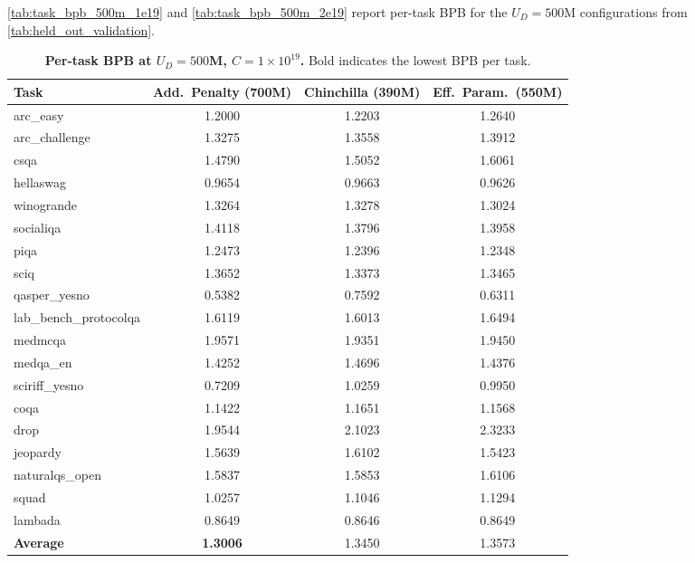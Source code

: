 \autoref{tab:task_bpb_500m_1e19} and \autoref{tab:task_bpb_500m_2e19} report per-task BPB for the $U_D = 500$M configurations from \autoref{tab:held_out_validation}.

\begin{table}[t]
    \centering
    \caption{\textbf{Per-task BPB at $U_D = 500$M, $C = 1 \times 10^{19}$.} Bold indicates the lowest BPB per task.}
    \label{tab:task_bpb_500m_1e19}
    \small
    \begin{tabular}{lccc}
        \toprule
        Task & Add.\ Penalty (700M) & Chinchilla (390M) & Eff.\ Param.\ (550M) \\
        \midrule
        arc\_easy & {1.2000} & 1.2203 & 1.2640 \\
        arc\_challenge & {1.3275} & 1.3558 & 1.3912 \\
        csqa & {1.4790} & 1.5052 & 1.6061 \\
        hellaswag & 0.9654 & 0.9663 & {0.9626} \\
        winogrande & 1.3264 & 1.3278 & {1.3024} \\
        socialiqa & 1.4118 & {1.3796} & 1.3958 \\
        piqa & 1.2473 & 1.2396 & {1.2348} \\
        sciq & 1.3652 & {1.3373} & 1.3465 \\
        qasper\_yesno & {0.5382} & 0.7592 & 0.6311 \\
        lab\_bench\_protocolqa & 1.6119 & {1.6013} & 1.6494 \\
        medmcqa & 1.9571 & {1.9351} & 1.9450 \\
        medqa\_en & {1.4252} & 1.4696 & 1.4376 \\
        sciriff\_yesno & {0.7209} & 1.0259 & 0.9950 \\
        \midrule
        coqa & {1.1422} & 1.1651 & 1.1568 \\
        drop & {1.9544} & 2.1023 & 2.3233 \\
        jeopardy & 1.5639 & 1.6102 & {1.5423} \\
        naturalqs\_open & {1.5837} & 1.5853 & 1.6106 \\
        squad & {1.0257} & 1.1046 & 1.1294 \\
        \midrule
        lambada & 0.8649 & 0.8646 & {0.8649} \\
        \midrule
        \textbf{Average} & \textbf{1.3006} & 1.3450 & 1.3573 \\
        \bottomrule
    \end{tabular}
\end{table}

